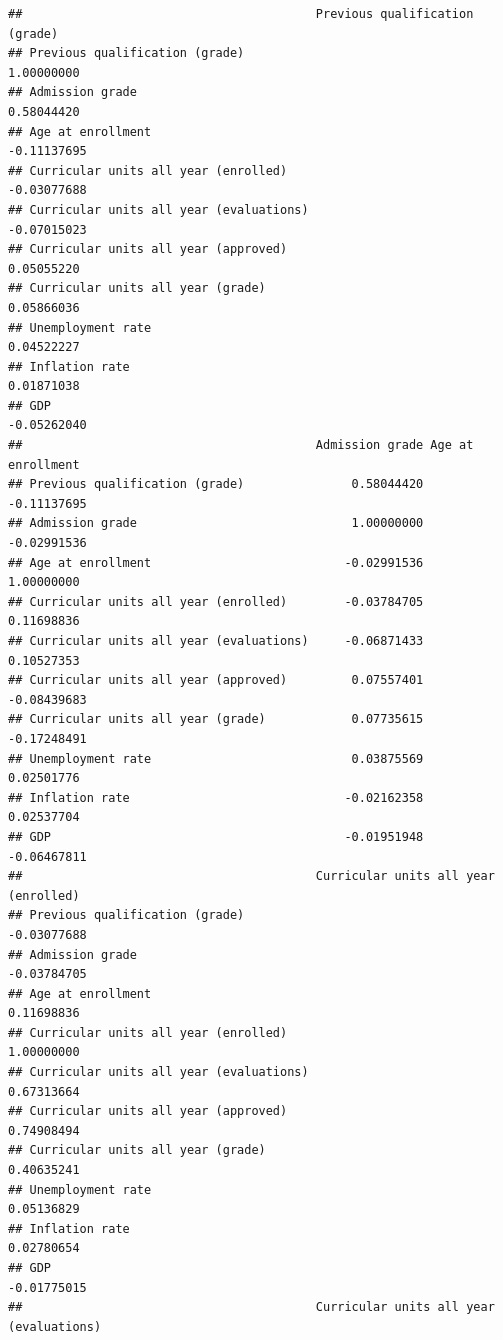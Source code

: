 \documentclass[
]{article}
\begin{document}
\begin{verbatim}
##                                         Previous qualification (grade)
## Previous qualification (grade)                              1.00000000
## Admission grade                                             0.58044420
## Age at enrollment                                          -0.11137695
## Curricular units all year (enrolled)                       -0.03077688
## Curricular units all year (evaluations)                    -0.07015023
## Curricular units all year (approved)                        0.05055220
## Curricular units all year (grade)                           0.05866036
## Unemployment rate                                           0.04522227
## Inflation rate                                              0.01871038
## GDP                                                        -0.05262040
##                                         Admission grade Age at enrollment
## Previous qualification (grade)               0.58044420       -0.11137695
## Admission grade                              1.00000000       -0.02991536
## Age at enrollment                           -0.02991536        1.00000000
## Curricular units all year (enrolled)        -0.03784705        0.11698836
## Curricular units all year (evaluations)     -0.06871433        0.10527353
## Curricular units all year (approved)         0.07557401       -0.08439683
## Curricular units all year (grade)            0.07735615       -0.17248491
## Unemployment rate                            0.03875569        0.02501776
## Inflation rate                              -0.02162358        0.02537704
## GDP                                         -0.01951948       -0.06467811
##                                         Curricular units all year (enrolled)
## Previous qualification (grade)                                   -0.03077688
## Admission grade                                                  -0.03784705
## Age at enrollment                                                 0.11698836
## Curricular units all year (enrolled)                              1.00000000
## Curricular units all year (evaluations)                           0.67313664
## Curricular units all year (approved)                              0.74908494
## Curricular units all year (grade)                                 0.40635241
## Unemployment rate                                                 0.05136829
## Inflation rate                                                    0.02780654
## GDP                                                              -0.01775015
##                                         Curricular units all year (evaluations)

\end{verbatim}
\end{document}
